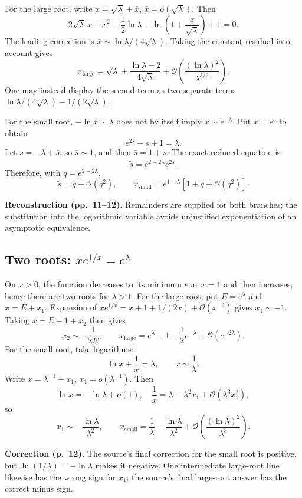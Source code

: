\documentclass[11pt,a4paper]{article}
\newcommand{\OO}{\mathcal O}
\newcommand{\src}[1]{\par\smallskip{\small\color{gray}Source PDF: page(s) #1.}\par}
\newcommand{\edit}[2]{\par\begingroup\small\color{blue!55!black}\textbf{#1.} #2\par\endgroup}
\numberwithin{equation}{section}
\begin{document}
For the large root, write $x=\sqrt\lambda+\bar x$,
$\bar x=o(\sqrt\lambda)$. Then
\[
 2\sqrt\lambda\,\bar x+\bar x^2
 -\frac12\ln\lambda
 -\ln\left(1+\frac{\bar x}{\sqrt\lambda}\right)+1=0.
\]
The leading correction is $\bar x\sim\ln\lambda/(4\sqrt\lambda)$.
Taking the constant residual into account gives
\begin{equation}
 x_{\mathrm{large}}=\sqrt\lambda
 +\frac{\ln\lambda-2}{4\sqrt\lambda}
 +\OO\left(\frac{(\ln\lambda)^2}{\lambda^{3/2}}\right).
\end{equation}
One may instead display the second term as two separate terms
$\ln\lambda/(4\sqrt\lambda)-1/(2\sqrt\lambda)$.

For the small root, $-\ln x\sim\lambda$ does not by itself imply
$x\sim e^{-\lambda}$. Put $x=e^s$ to obtain
\[
 e^{2s}-s+1=\lambda.
\]
Let $s=-\lambda+\bar s$, so $\bar s\sim1$, and then
$\bar s=1+\widetilde s$. The exact reduced equation is
\[
 \widetilde s=e^{2-2\lambda}e^{2\widetilde s}.
\]
Therefore, with $q=e^{2-2\lambda}$,
\[
 \widetilde s=q+\OO(q^2),\qquad
 x_{\mathrm{small}}=e^{1-\lambda}[1+q+\OO(q^2)].
\]
\edit{Reconstruction (pp.~11--12)}{Remainders are supplied for both
branches; the substitution into the logarithmic variable avoids
unjustified exponentiation of an asymptotic equivalence.}

\subsection{\texorpdfstring{Two roots: $xe^{1/x}=e^\lambda$}{Two roots: exponential equation}}
\src{12}
On $x>0$, the function decreases to its minimum $e$ at $x=1$ and
then increases; hence there are two roots for $\lambda>1$.
For the large root, put $E=e^\lambda$ and $x=E+x_1$.
Expansion of $xe^{1/x}=x+1+1/(2x)+\OO(x^{-2})$ gives
$x_1\sim-1$. Taking $x=E-1+x_2$ then gives
\[
 x_2\sim-\frac1{2E},\qquad
 x_{\mathrm{large}}=e^\lambda-1-\frac12e^{-\lambda}
 +\OO(e^{-2\lambda}).
\]
For the small root, take logarithms:
\[
 \ln x+\frac1x=\lambda,\qquad x\sim\frac1\lambda.
\]
Write $x=\lambda^{-1}+x_1$, $x_1=o(\lambda^{-1})$. Then
\[
 \ln x=-\ln\lambda+o(1),\quad
 \frac1x=\lambda-\lambda^2x_1+\OO(\lambda^3x_1^2),
\]
so
\[
 x_1\sim-\frac{\ln\lambda}{\lambda^2},\qquad
 x_{\mathrm{small}}=\frac1\lambda-
 \frac{\ln\lambda}{\lambda^2}
 +\OO\left(\frac{(\ln\lambda)^2}{\lambda^3}\right).
\]
\edit{Correction (p.~12)}{The source's final correction for the small
root is positive, but $\ln(1/\lambda)=-\ln\lambda$ makes it negative.
One intermediate large-root line likewise has the wrong sign for
$x_1$; the source's final large-root answer has the correct minus sign.}
\end{document}
